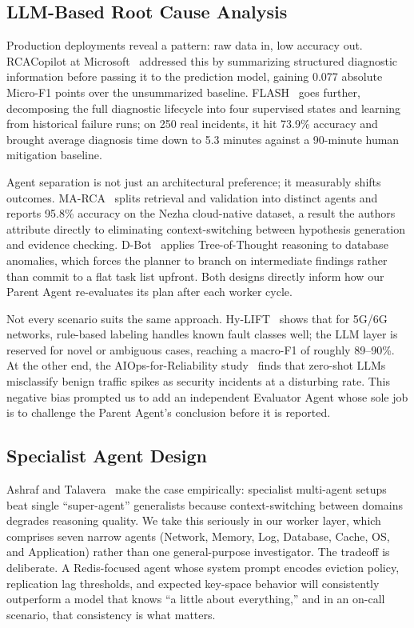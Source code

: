 \documentclass[conference]{IEEEtran}
\begin{document}
\subsection{LLM-Based Root Cause Analysis}
Production deployments reveal a pattern: raw data in, low accuracy out. RCACopilot at
Microsoft~\cite{chen2024rcacopilot} addressed this by summarizing structured diagnostic
information before passing it to the prediction model, gaining 0.077 absolute Micro-F1 points
over the unsummarized baseline. FLASH~\cite{zhang2024flash} goes further, decomposing the
full diagnostic lifecycle into four supervised states and learning from historical failure
runs; on 250 real incidents, it hit 73.9\% accuracy and brought average diagnosis time down
to 5.3 minutes against a 90-minute human mitigation baseline.

Agent separation is not just an architectural preference; it measurably shifts outcomes.
MA-RCA~\cite{fu2026marca} splits retrieval and validation into distinct agents and reports
95.8\% accuracy on the Nezha cloud-native dataset, a result the authors attribute directly
to eliminating context-switching between hypothesis generation and evidence checking.
D-Bot~\cite{zhou2023dbot} applies Tree-of-Thought reasoning to database anomalies, which
forces the planner to branch on intermediate findings rather than commit to a flat task list
upfront. Both designs directly inform how our Parent Agent re-evaluates its plan after each
worker cycle.

Not every scenario suits the same approach. Hy-LIFT~\cite{salman2025hylift} shows that for
5G/6G networks, rule-based labeling handles known fault classes well; the LLM layer is reserved
for novel or ambiguous cases, reaching a macro-F1 of roughly 89--90\%. At the other end,
the AIOps-for-Reliability study~\cite{szandala2025aiops_reliability} finds that zero-shot LLMs
misclassify benign traffic spikes as security incidents at a disturbing rate. This negative
bias prompted us to add an independent Evaluator Agent whose sole job is to challenge
the Parent Agent's conclusion before it is reported.

\subsection{Specialist Agent Design}
Ashraf and Talavera~\cite{ashraf2025autonomous} make the case empirically: specialist
multi-agent setups beat single ``super-agent'' generalists because context-switching between
domains degrades reasoning quality. We take this seriously in our worker layer, which comprises
seven narrow agents (Network, Memory, Log, Database, Cache, OS, and Application) rather than
one general-purpose investigator. The tradeoff is deliberate. A Redis-focused agent whose
system prompt encodes eviction policy, replication lag thresholds, and expected key-space
behavior will consistently outperform a model that knows ``a little about everything,'' and
in an on-call scenario, that consistency is what matters.
\end{document}

